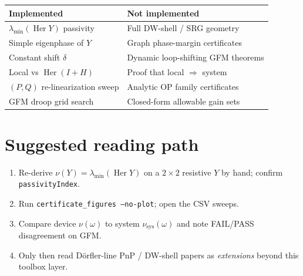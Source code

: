 \documentclass[11pt,a4paper]{article}
\theoremstyle{definition}
\begin{document}
\begin{center}
\begin{tabular}{@{}p{}p{}@{}}
\toprule
\textbf{Implemented} & \textbf{Not implemented} \\
\midrule
$\lambda_{\min}(\operatorname{Her} Y)$ passivity &
Full DW-shell / SRG geometry \\
Simple eigenphase of $Y$ &
Graph phase-margin certificates \\
Constant shift $\delta$ &
Dynamic loop-shifting GFM theorems \\
Local vs $\operatorname{Her}(I+H)$ &
Proof that local $\Rightarrow$ system \\
$(P,Q)$ re-linearization sweep &
Analytic OP family certificates \\
GFM droop grid search &
Closed-form allowable gain sets \\
\bottomrule
\end{tabular}
\end{center}

\section*{Suggested reading path}

\begin{enumerate}[leftmargin=*]
  \item Re-derive $\nu(Y)=\lambda_{\min}(\operatorname{Her} Y)$ on a $2\times 2$
  resistive $Y$ by hand; confirm \texttt{passivityIndex}.
  \item Run \texttt{certificate\_figures --no-plot}; open the CSV sweeps.
  \item Compare device $\nu(\omega)$ to system $\nu_{\mathrm{sys}}(\omega)$
  and note FAIL/PASS disagreement on GFM.
  \item Only then read D\"orfler-line PnP / DW-shell papers as
  \emph{extensions} beyond this toolbox layer.
\end{enumerate}
\end{document}
